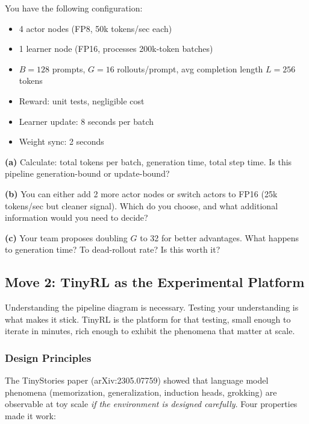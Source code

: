 \begin{exercise}
You have the following configuration:
\begin{itemize}
  \item 4 actor nodes (FP8, 50k tokens/sec each)
  \item 1 learner node (FP16, processes 200k-token batches)
  \item $B = 128$ prompts, $G = 16$ rollouts/prompt, avg completion length $L = 256$ tokens
  \item Reward: unit tests, negligible cost
  \item Learner update: 8 seconds per batch
  \item Weight sync: 2 seconds
\end{itemize}

\textbf{(a)} Calculate: total tokens per batch, generation time, total step time. Is this pipeline generation-bound or update-bound?

\textbf{(b)} You can either add 2 more actor nodes or switch actors to FP16 (25k tokens/sec but cleaner signal). Which do you choose, and what additional information would you need to decide?

\textbf{(c)} Your team proposes doubling $G$ to 32 for better advantages. What happens to generation time? To dead-rollout rate? Is this worth it?
\end{exercise}

\subsection*{Move 2: TinyRL as the Experimental Platform}

Understanding the pipeline diagram is necessary. Testing your understanding is what makes it stick. TinyRL is the platform for that testing, small enough to iterate in minutes, rich enough to exhibit the phenomena that matter at scale.

\subsubsection*{Design Principles}

The TinyStories paper (arXiv:2305.07759) showed that language model phenomena (memorization, generalization, induction heads, grokking) are observable at toy scale \textit{if the environment is designed carefully}. Four properties made it work:

